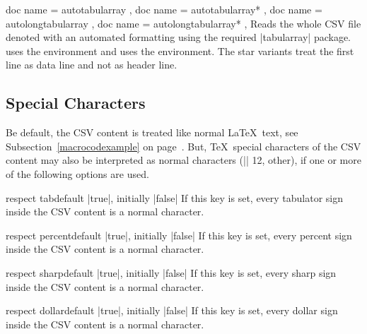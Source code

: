 \documentclass[a4paper,11pt]{ltxdoc}
\begin{document}
\begin{docCsvKeys}[
    doc parameter   = {=\meta{file name}},
    doc description = no default,
    doc new = {2023-10-13}
  ]
  {
    { doc name = autotabularray },
    { doc name = autotabularray* },
    { doc name = autolongtabularray },
    { doc name = autolongtabularray* },
  }
  Reads the whole CSV file denoted  with an automated formatting
  using the required |tabularray| package.
   uses the  environment and
   uses the  environment.
  The star variants treat the first line as data line and not as header line.
\end{docCsvKeys}


\clearpage
\subsection{Special Characters}\label{subsec:specchar}
Be default, the CSV content is treated like normal \LaTeX\ text, see
Subsection~\ref{macrocodexample} on page~\pageref{macrocodexample}.
But, \TeX\ special characters of the CSV content may also be interpreted
as normal characters (|\catcode| 12, other), if one or more of the following options are used.

\begin{docCsvKey}{respect tab}{}{default |true|, initially |false|}
  If this key is set, every
  tabulator sign
  inside the CSV content is a normal character.
\end{docCsvKey}

\begin{docCsvKey}{respect percent}{}{default |true|, initially |false|}
  If this key is set, every
  percent sign \verbbox{\%}
  inside the CSV content is a normal character.
\end{docCsvKey}

\begin{docCsvKey}{respect sharp}{}{default |true|, initially |false|}
  If this key is set, every
  sharp sign \verbbox{\#}
  inside the CSV content is a normal character.
\end{docCsvKey}

\begin{docCsvKey}{respect dollar}{}{default |true|, initially |false|}
  If this key is set, every
  dollar sign \verbbox{\$}
  inside the CSV content is a normal character.
\end{docCsvKey}
\end{document}
